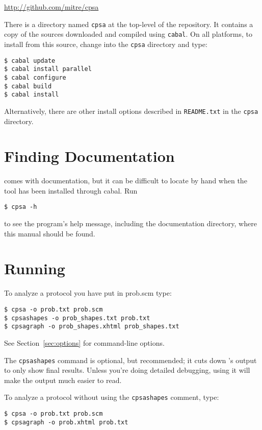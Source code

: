 \begin{center}
  \url{http://github.com/mitre/cpsa}
\end{center}

There is a directory named \texttt{cpsa} at the top-level of the
repository.  It contains a copy of the {\cpsa} sources downloaded and
compiled using \texttt{cabal}.  On all platforms, to install from this
source, change into the \texttt{cpsa} directory and type:

\begin{verbatim}
$ cabal update
$ cabal install parallel
$ cabal configure
$ cabal build
$ cabal install
\end{verbatim}

Alternatively, there are other install options described in
\texttt{README.txt} in the \texttt{cpsa} directory.

\section{Finding Documentation}
{\cpsa} comes with documentation, but it can be difficult to locate by
hand when the tool has been installed through cabal.  Run

\texttt{\$ cpsa -h}

\noindent
to see the program's help message, including the documentation
directory, where this manual should be found.

\section{Running {\cpsa}}
\label{sec:running}

To analyze a protocol you have put in prob.scm type:
\begin{verbatim}
$ cpsa -o prob.txt prob.scm
$ cpsashapes -o prob_shapes.txt prob.txt
$ cpsagraph -o prob_shapes.xhtml prob_shapes.txt
\end{verbatim}

See Section~\ref{sec:options} for command-line options.

The \texttt{cpsashapes} command is optional, but recommended; it cuts
down {\cpsa}'s output to only show final results. Unless you're
doing detailed debugging, using it will make the output much easier to
read.

To analyze a protocol without using the \texttt{cpsashapes} comment, type:
\begin{verbatim}
$ cpsa -o prob.txt prob.scm
$ cpsagraph -o prob.xhtml prob.txt
\end{verbatim}

